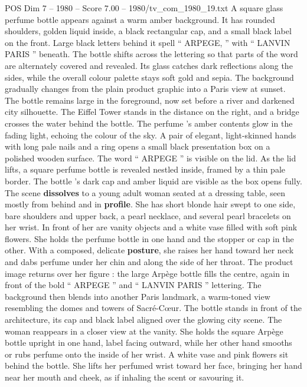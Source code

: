 \begin{textsample}{POS Dim 7 – 1980 – Score 7.00 – 1980/tv\_com\_1980\_19.txt}  \label{ex:f7_pos_043}
A square glass perfume bottle appears against a warm amber background.
It has rounded shoulders, golden liquid inside, a black rectangular cap, and a small black label on the front.
Large black letters behind it spell “ ARPEGE, ” with “ LANVIN PARIS ” beneath.
The bottle shifts across the lettering so that parts of the word are alternately covered and revealed.
Its glass catches dark reflections along the sides, while the overall colour palette stays soft gold and sepia.
The background gradually changes from the plain product graphic into a Paris view at sunset.
The bottle remains large in the foreground, now set before a river and darkened city silhouette.
The Eiffel Tower stands in the distance on the right, and a bridge crosses the water behind the bottle.
The perfume ’s amber contents glow in the fading light, echoing the colour of the sky.
A pair of elegant, light-skinned hands with long pale nails and a ring opens a small black presentation box on a polished wooden surface.
The word “ ARPEGE ” is visible on the lid.
As the lid lifts, a square perfume bottle is revealed nestled inside, framed by a thin pale border.
The bottle ’s dark cap and amber liquid are visible as the box opens fully.
The scene \textbf{dissolves} to a young adult woman seated at a dressing table, seen mostly from behind and in \textbf{profile}.
She has short blonde hair swept to one side, bare shoulders and upper back, a pearl necklace, and several pearl bracelets on her wrist.
In front of her are vanity objects and a white vase filled with soft pink flowers.
She holds the perfume bottle in one hand and the stopper or cap in the other.
With a composed, delicate \textbf{posture}, she raises her hand toward her neck and dabs perfume under her chin and along the side of her throat.
The product image returns over her figure : the large Arpège bottle fills the centre, again in front of the bold “ ARPEGE ” and “ LANVIN PARIS ” lettering.
The background then blends into another Paris landmark, a warm-toned view resembling the domes and towers of Sacré-Cœur.
The bottle stands in front of the architecture, its cap and black label aligned over the glowing city scene.
The woman reappears in a closer view at the vanity.
She holds the square Arpège bottle upright in one hand, label facing outward, while her other hand smooths or rubs perfume onto the inside of her wrist.
A white vase and pink flowers sit behind the bottle.
She lifts her perfumed wrist toward her face, bringing her hand near her mouth and cheek, as if inhaling the scent or savouring it.

\end{textsample}
